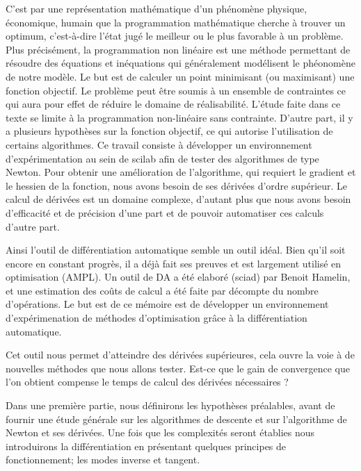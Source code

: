 \documentclass[hypertexte]{scienceUdeS}
\begin{document}
\enteteDeLaThese{}
\renewcommand{\chaptermark}[1]{\markboth{\textsc{\chaptername\ \thechapter.\ #1}}{}}
\renewcommand{\sectionmark}[1]{\markright{\textsc{\thesection. #1}}	}
    

\Introduction


C'est par une représentation mathématique d'un phénomène physique, économique, humain que la programmation mathématique cherche à trouver
un optimum, c'est-à-dire l'état jugé le meilleur ou le plus favorable à un problème. Plus précisément, la programmation non linéaire
est une méthode permettant de résoudre des équations et inéquations qui généralement modélisent le phéonomène de notre modèle.
Le but est de calculer un point minimisant (ou maximisant) une fonction objectif. Le problème peut être soumis à un ensemble de contraintes
ce qui aura pour effet de réduire le domaine de réalisabilité.
L'étude faite dans ce texte se limite à la programmation non-linéaire sans contrainte. D'autre part, il y a plusieurs hypothèses sur la 
fonction objectif, ce qui autorise l'utilisation de certains algorithmes. Ce travail consiste à développer
un environnement d'expérimentation au sein de scilab afin de tester des algorithmes de type Newton. Pour obtenir une amélioration 
de l'algorithme, qui requiert le gradient et le hessien de la fonction, nous avons besoin de ses dérivées d'ordre supérieur. Le calcul
de dérivées est un domaine complexe, d'autant plus que nous avons besoin d'efficacité et de précision d'une part et de pouvoir automatiser
ces calculs d'autre part.

Ainsi l'outil de différentiation automatique semble un outil idéal. Bien qu'il soit encore en constant progrès, il a déjà fait ses preuves
et est largement utilisé en optimisation (AMPL).  
Un outil de DA a été elaboré (sciad) par Benoit Hamelin, et une estimation des co\^uts de calcul a été faite 
par décompte du nombre d'opérations.
Le but est de ce mémoire est de développer un environnement d'expérimenation de méthodes d'optimisation
gr\^ace à la différentiation automatique.

Cet outil nous permet d'atteindre des dérivées supérieures, cela ouvre la voie à de nouvelles méthodes que nous 
allons tester. Est-ce que le gain de convergence que l'on obtient compense le temps de calcul des dérivées nécessaires ?


Dans une première partie, nous définirons les hypothèses préalables, avant de fournir une étude générale
sur les algorithmes de descente et sur l'algorithme de Newton et ses dérivées. Une fois que les complexités seront établies
nous introduirons la différentiation en présentant quelques principes de fonctionnement; les modes inverse et tangent.
\end{document}
